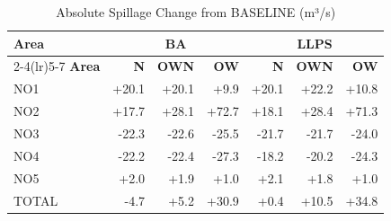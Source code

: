\begin{table}[htbp]
\centering
\caption{Absolute Spillage Change from BASELINE (m³/s)}
\label{tab:spillage_abs_change}
\small
\begin{tabular}{lrrrrrr}
\toprule
\textbf{Area} & \multicolumn{3}{c}{\textbf{BA}} & \multicolumn{3}{c}{\textbf{LLPS}} \\
\cmidrule(lr){2-4}\cmidrule(lr){5-7}
\textbf{Area} & \textbf{N} & \textbf{OWN} & \textbf{OW} & \textbf{N} & \textbf{OWN} & \textbf{OW} \\
\midrule
NO1 & +20.1 & +20.1 & +9.9 & +20.1 & +22.2 & +10.8 \\
NO2 & +17.7 & +28.1 & +72.7 & +18.1 & +28.4 & +71.3 \\
NO3 & -22.3 & -22.6 & -25.5 & -21.7 & -21.7 & -24.0 \\
NO4 & -22.2 & -22.4 & -27.3 & -18.2 & -20.2 & -24.3 \\
NO5 & +2.0 & +1.9 & +1.0 & +2.1 & +1.8 & +1.0 \\
TOTAL & -4.7 & +5.2 & +30.9 & +0.4 & +10.5 & +34.8 \\
\bottomrule
\end{tabular}
\end{table}